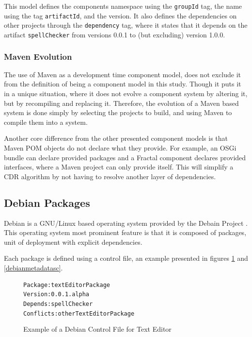 This model defines the components namespace using the \verb+groupId+ tag, the name using the tag \verb+artifactId+, and the version.
It also defines the dependencies on other projects through the \verb+dependency+ tag,
where it states that it depends on the artifact \verb+spellChecker+ from versions 0.0.1 to (but excluding) version 1.0.0.

\subsubsection{Maven Evolution}
The use of Maven as a development time component model, does not exclude it from the definition of being a component model in this study.
Though it puts it in a unique situation, where it does not evolve a component system by altering it, but by recompiling and replacing it.
Therefore, the evolution of a Maven based system is done simply by selecting the projects to build, and using Maven to compile them into a system. 

Another core difference from the other presented component models is that Maven POM objects do not declare what they provide.
For example, an OSGi bundle can declare provided packages and a Fractal component declares provided interfaces, where a Maven project can only provide itself.
This will simplify a CDR algorithm by not having to resolve another layer of dependencies.

\subsection{Debian Packages}
Debian is a GNU/Linux based operating system provided by the Debain Project \citep{Barth2005}.
This operating system most prominent feature is that it is composed of packages, unit of deployment with explicit dependencies.

Each package is defined using a control file, an example presented in figures \ref{debianmetadatate} and \ref{debianmetadatasc}.

\begin{figure}[htp]
\begin{center}
\begin{alltt}
Package: textEditorPackage
Version: 0.0.1.alpha
Depends: spellChecker
Conflicts: otherTextEditorPackage
\end{alltt}
  \caption[Debian Control file for Text Editor]{Example of a Debian Control File for Text Editor}
  \label{debianmetadatate}
\end{center}
\end{figure}

